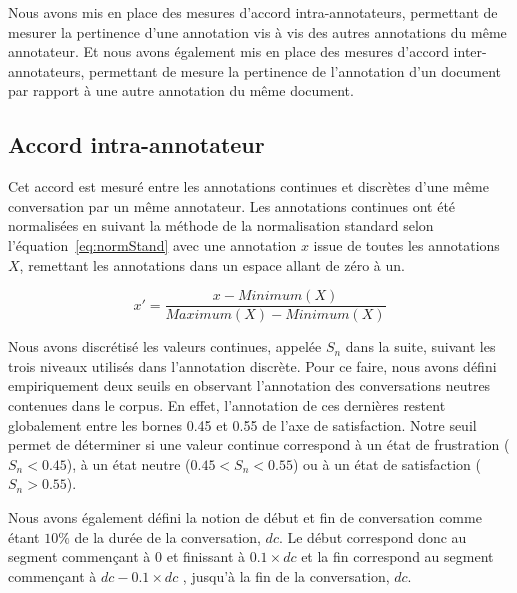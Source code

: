 Nous avons mis en place des mesures d'accord intra-annotateurs, permettant de mesurer la pertinence d'une annotation vis à vis des autres annotations du même annotateur. Et nous avons également mis en place des mesures d'accord inter-annotateurs, permettant de mesure la pertinence de l'annotation d'un document par rapport à une autre annotation du même document. %

\subsection{Accord intra-annotateur}

Cet accord est mesuré entre les annotations continues et discrètes d'une même conversation par un même annotateur. Les annotations continues ont été normalisées en suivant la méthode de la normalisation standard selon l'équation~\ref{eq:normStand} avec une annotation $x$ issue de toutes les annotations $X$, remettant les annotations dans un espace allant de zéro à un.

\begin{equation}
  x' = \frac{x-Minimum(X)}{Maximum(X)-Minimum(X)}
  \label{eq:normStand}
\end{equation}

Nous avons discrétisé les valeurs continues, appelée $S_n$ dans la suite, suivant les trois niveaux utilisés dans l'annotation discrète. Pour ce faire, nous avons défini empiriquement deux seuils en observant l'annotation des conversations neutres contenues dans le corpus. En effet, l'annotation de ces dernières restent globalement entre les bornes 0.45 et 0.55 de l'axe de satisfaction. Notre seuil permet de déterminer si une valeur continue correspond à un état de frustration ($S_n<0.45$), à un état neutre ($0.45 < S_n < 0.55$) ou à un état de satisfaction ($S_n > 0.55$).

Nous avons également défini la notion de début et fin de conversation comme étant $10\%$ de la durée de la conversation, $dc$.
Le début correspond donc au segment commençant à 0 et finissant à $0.1\times dc$ et la fin correspond au segment commençant à $ dc - 0.1\times dc$ , jusqu'à la fin de la conversation, $dc$.

